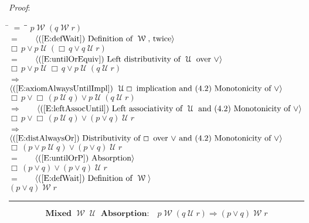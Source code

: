 \documentclass[12pt, fleqn, leqno]{article}
\newcommand{\lgap}{2pt}                             %
\newcommand{\mymathindent}{24pt}                    %
\newcommand{\impl}{\ensuremath{\Rightarrow}}        %
\newcommand{\Until}{\;\mathcal{U}\;}
\newcommand{\Wait}{\;\mathcal{W}\;}
\newcommand{\Always}{\Box\,}
\newcommand{\myqed}{\rule[-.23ex]{1.2ex}{2.0ex}}
\newcommand{\myqedtab}{\hspace{384pt}}              %
\newcommand{\Gll} {\langle}                         %
\newcommand{\Ggg} {\rangle}                         %
\newcommand{\Hint}[1]     {\ \ \ $\Gll              \mbox{#1} \Ggg$ }   %
\begin{document}
\emph{Proof}:
\begin{tabbing}
\hspace{\mymathindent} \= $= \;$ \= \myqedtab \= \kill
\> \>   $p \Wait (q \Wait r)$\\[\lgap]
\> $=$ \> \Hint{(\ref{E:defWait}) Definition of $\Wait$, twice} \\[\lgap]
\> \>   $\Always p\lor p\Until (\Always q\lor q \Until r)$\\[\lgap]
\> $=$  \>  \Hint{(\ref{E:untilOrEquiv}) Left distributivity of $\Until$ over $\lor$}\\[\lgap]
\> \>   $\Always p\lor p\Until \Always q\lor p\Until (q \Until r)$\\[\lgap]
\> $\impl$ \> \Hint{(\ref{E:axiomAlwaysUntilImpl}) $\Until\Always$ implication and (4.2) Monotonicity of $\lor$}\\[\lgap]
\> \>   $\Always p\lor \Always (p\Until q)\lor p\Until (q \Until r)$\\[\lgap]
\> $\impl$ \> \Hint{(\ref{E:leftAssocUntil}) Left associativity of $\Until$ and (4.2) Monotonicity of $\lor$} \\[\lgap]
\> \>   $\Always p\lor \Always (p\Until q)\lor (p\lor q) \Until r$\\[\lgap]
  \> $\impl$  \>  \Hint{(\ref{E:distAlwaysOr}) Distributivity of $\Always$ over $\lor$ and (4.2) Monotonicity of $\lor$}\\[\lgap]
\> \>   $\Always (p\lor p\Until q)\lor (p\lor q) \Until r$\\[\lgap]
\> $=$ \> \Hint{(\ref{E:untilOrP}) Absorption} \\[\lgap]
\> \>   $\Always (p\lor q)\lor (p\lor q) \Until r$\\[\lgap]
\> $=$ \> \Hint{(\ref{E:defWait}) Definition of $\Wait$} \\[\lgap]
\> \>   $(p\lor q) \Wait r$ \quad \myqed
\end{tabbing}

\begin{equation}\label{E:mix4untilImpAbsR}
\textbf{Mixed $\Wait\Until$ Absorption:}\quad p \Wait (q \Until r) \impl (p \lor q) \Wait r
\end{equation}
\end{document}
